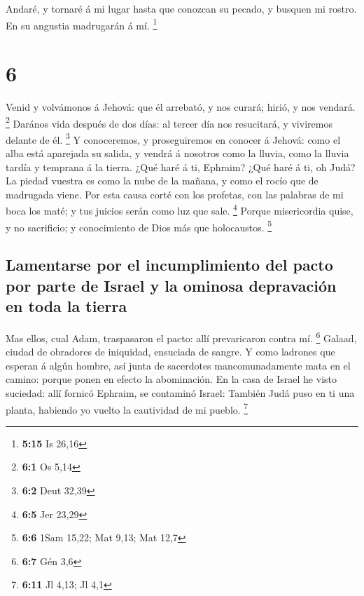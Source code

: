  Andaré, y tornaré á mi lugar hasta que conozcan su
pecado, y busquen mi rostro. En su angustia madrugarán á mí. \footnote{\textbf{5:15}
  Is 26,16}

\hypertarget{section-5}{%
\section{6}\label{section-5}}

 Venid y volvámonos á Jehová: que él arrebató, y nos
curará; hirió, y nos vendará. \footnote{\textbf{6:1} Os 5,14}
 Darános vida después de dos días: al tercer día nos
resucitará, y viviremos delante de él. \footnote{\textbf{6:2} Deut 32,39}
 Y conoceremos, y proseguiremos en conocer á Jehová: como
el alba está aparejada su salida, y vendrá á nosotros como la lluvia,
como la lluvia tardía y temprana á la tierra.  ¿Qué haré á
ti, Ephraim? ¿Qué haré á ti, oh Judá? La piedad vuestra es como la nube
de la mañana, y como el rocío que de madrugada viene.  Por
esta causa corté con los profetas, con las palabras de mi boca los maté;
y tus juicios serán como luz que sale. \footnote{\textbf{6:5} Jer 23,29}
 Porque misericordia quise, y no sacrificio; y
conocimiento de Dios más que holocaustos. \footnote{\textbf{6:6} 1Sam
  15,22; Mat 9,13; Mat 12,7}

\hypertarget{lamentarse-por-el-incumplimiento-del-pacto-por-parte-de-israel-y-la-ominosa-depravaciuxf3n-en-toda-la-tierra}{%
\subsection{Lamentarse por el incumplimiento del pacto por parte de
Israel y la ominosa depravación en toda la
tierra}\label{lamentarse-por-el-incumplimiento-del-pacto-por-parte-de-israel-y-la-ominosa-depravaciuxf3n-en-toda-la-tierra}}

 Mas ellos, cual Adam, traspasaron el pacto: allí
prevaricaron contra mí. \footnote{\textbf{6:7} Gén 3,6} 
Galaad, ciudad de obradores de iniquidad, ensuciada de sangre.
 Y como ladrones que esperan á algún hombre, así junta de
sacerdotes mancomunadamente mata en el camino: porque ponen en efecto la
abominación.  En la casa de Israel he visto suciedad:
allí fornicó Ephraim, se contaminó Israel:  También Judá
puso en ti una planta, habiendo yo vuelto la cautividad de mi pueblo.
\footnote{\textbf{6:11} Jl 4,13; Jl 4,1}

